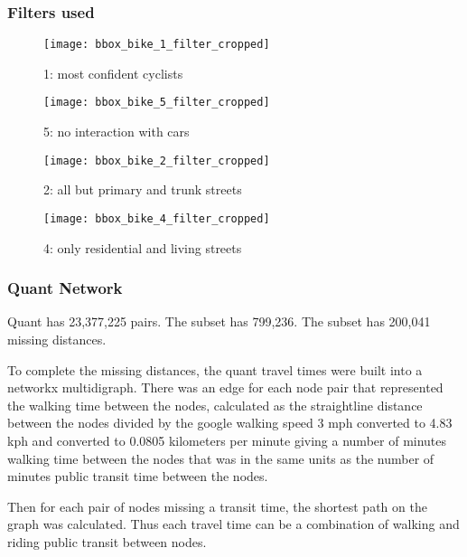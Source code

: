 \subsubsection{Filters used}

\begin{figure}
  \centering
  \texttt{[image: bbox\_bike\_1\_filter\_cropped]}
  \caption{1: most confident cyclists}
  \label{fig:sub1}
\end{figure}

\begin{figure}
  \centering
  \texttt{[image: bbox\_bike\_5\_filter\_cropped]}
  \caption{5: no interaction with cars }
  \label{fig:sub2}
\end{figure}



\begin{figure}
  \centering
  \texttt{[image: bbox\_bike\_2\_filter\_cropped]}
  \caption{2: all but primary and trunk streets}
  \label{fig:sub2}
\end{figure}



\begin{figure}
  \centering
  \texttt{[image: bbox\_bike\_4\_filter\_cropped]}
  \caption{4: only residential and living streets}
  \label{fig:sub2}
\end{figure}


\subsubsection{Quant Network}

Quant has 23,377,225 pairs. The subset has 799,236. The subset has 200,041 missing distances. 

To complete the missing distances, the quant travel times were built into a networkx multidigraph. There was an edge for each node pair that represented the walking time between the nodes, calculated as the straightline distance between the nodes divided by the google walking speed 3 mph converted to 4.83 kph and converted to  0.0805 kilometers per minute giving a number of minutes walking time between the nodes that was in the same units as the number of minutes public transit time between the nodes. 

Then for each pair of nodes missing a transit time, the shortest path on the graph was calculated. Thus each travel time can be a combination of walking and riding public transit between nodes. 


